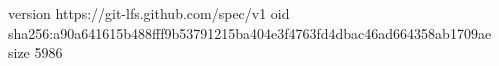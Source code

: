version https://git-lfs.github.com/spec/v1
oid sha256:a90a641615b488fff9b53791215ba404e3f4763fd4dbac46ad664358ab1709ae
size 5986
